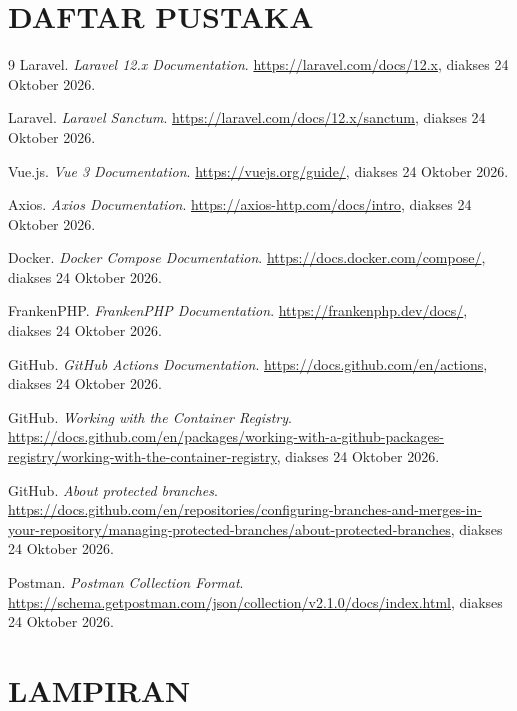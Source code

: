 \documentclass[12pt,a4paper,oneside]{book}
\begin{document}
\backmatter
\chapter*{DAFTAR PUSTAKA}

\begin{thebibliography}{9}
Laravel. \emph{Laravel 12.x Documentation}. \url{https://laravel.com/docs/12.x}, diakses 24 Oktober 2026.

Laravel. \emph{Laravel Sanctum}. \url{https://laravel.com/docs/12.x/sanctum}, diakses 24 Oktober 2026.

Vue.js. \emph{Vue 3 Documentation}. \url{https://vuejs.org/guide/}, diakses 24 Oktober 2026.

Axios. \emph{Axios Documentation}. \url{https://axios-http.com/docs/intro}, diakses 24 Oktober 2026.

Docker. \emph{Docker Compose Documentation}. \url{https://docs.docker.com/compose/}, diakses 24 Oktober 2026.

FrankenPHP. \emph{FrankenPHP Documentation}. \url{https://frankenphp.dev/docs/}, diakses 24 Oktober 2026.

GitHub. \emph{GitHub Actions Documentation}. \url{https://docs.github.com/en/actions}, diakses 24 Oktober 2026.

GitHub. \emph{Working with the Container Registry}. \url{https://docs.github.com/en/packages/working-with-a-github-packages-registry/working-with-the-container-registry}, diakses 24 Oktober 2026.

GitHub. \emph{About protected branches}. \url{https://docs.github.com/en/repositories/configuring-branches-and-merges-in-your-repository/managing-protected-branches/about-protected-branches}, diakses 24 Oktober 2026.

Postman. \emph{Postman Collection Format}. \url{https://schema.getpostman.com/json/collection/v2.1.0/docs/index.html}, diakses 24 Oktober 2026.
\end{thebibliography}

\appendix
\clearpage
{}
\chapter*{LAMPIRAN}
\setcounter{chapter}{1}
\renewcommand{\thechapter}{A}
\setcounter{section}{0}
\end{document}
